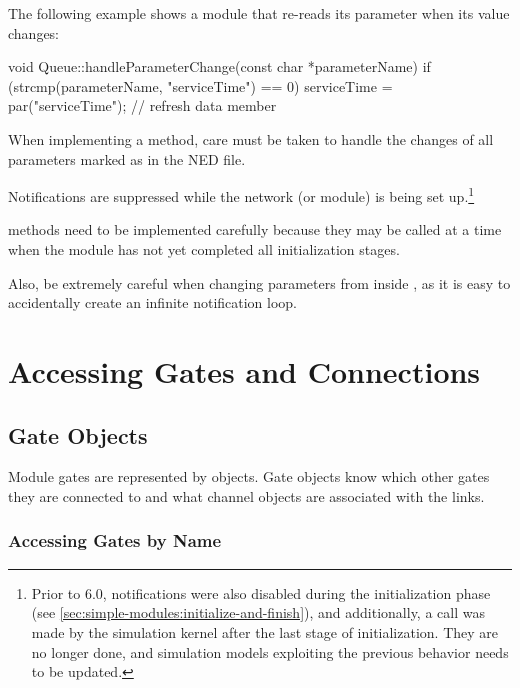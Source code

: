 The following example shows a module that re-reads
its  parameter when its value changes:

\begin{cpp}
void Queue::handleParameterChange(const char *parameterName)
{
    if (strcmp(parameterName, "serviceTime") == 0)
        serviceTime = par("serviceTime"); // refresh data member
}
\end{cpp}

\begin{note}
  When implementing a  method, care must be taken
  to handle the changes of all parameters marked as  in the NED
  file.
\end{note}

Notifications are suppressed while the network (or module) is being set
up.\footnote{Prior to {\opp} 6.0, notifications were also disabled during the
initialization phase (see \ref{sec:simple-modules:initialize-and-finish}), and
additionally, a  call was made by the
simulation kernel after the last stage of initialization. They are no longer
done, and simulation models exploiting the previous behavior needs to be
updated.}

 methods need to be implemented carefully because
they may be called at a time when the module has not yet completed all
initialization stages.

Also, be extremely careful when changing parameters from inside
, as it is easy to accidentally create an
infinite notification loop.


\section{Accessing Gates and Connections}
\label{sec:simple-modules:gates}

\subsection{Gate Objects}
\label{sec:simple-modules:gate-objects}

Module gates are represented by  objects.
Gate objects know which other gates they are connected to and
what channel objects are associated with the links.

\subsubsection{Accessing Gates by Name}
\label{sec:simple-modules:accessing-gates-by-name}

